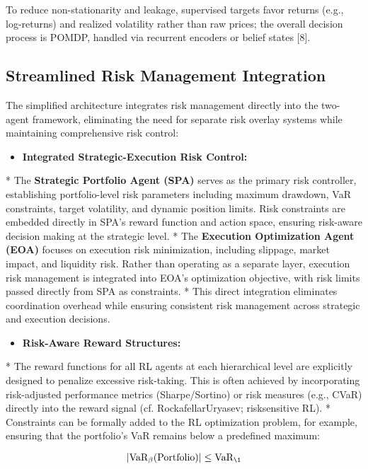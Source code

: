 \documentclass[11pt]{article}
\begin{document}
To reduce non-stationarity and leakage, supervised targets favor returns (e.g., log-returns) and realized volatility rather than raw prices; the overall decision process is POMDP, handled via recurrent encoders or belief states [8].

\subsection{Streamlined Risk Management Integration}

The simplified architecture integrates risk management directly into the two-agent framework, eliminating the need for separate risk overlay systems while maintaining comprehensive risk control:

\begin{itemize}
\item   \textbf{Integrated Strategic-Execution Risk Control:}
\end{itemize}
    *   The \textbf{Strategic Portfolio Agent (SPA)} serves as the primary risk controller, establishing portfolio-level risk parameters including maximum drawdown, VaR constraints, target volatility, and dynamic position limits. Risk constraints are embedded directly in SPA's reward function and action space, ensuring risk-aware decision making at the strategic level.
    *   The \textbf{Execution Optimization Agent (EOA)} focuses on execution risk minimization, including slippage, market impact, and liquidity risk. Rather than operating as a separate layer, execution risk management is integrated into EOA's optimization objective, with risk limits passed directly from SPA as constraints.
    *   This direct integration eliminates coordination overhead while ensuring consistent risk management across strategic and execution decisions.

\begin{itemize}
\item   \textbf{Risk-Aware Reward Structures:}
\end{itemize}
    *   The reward functions for all RL agents at each hierarchical level are explicitly designed to penalize excessive risk-taking. This is often achieved by incorporating risk-adjusted performance metrics (Sharpe/Sortino) or risk measures (e.g., CVaR) directly into the reward signal (cf. RockafellarUryasev; risksensitive RL).
    *   Constraints can be formally added to the RL optimization problem, for example, ensuring that the portfolio's VaR remains below a predefined maximum:
    
\begin{equation}
|\text{VaR}_\beta(\text{Portfolio})| \leq \text{VaR}_{\text{\1}}
\end{equation}
\end{document}
